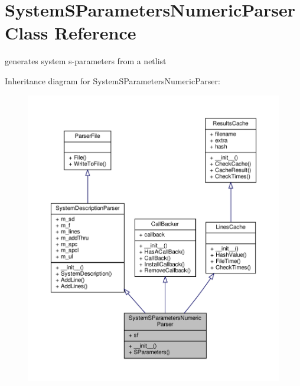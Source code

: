 \hypertarget{classSignalIntegrity_1_1Parsers_1_1SystemSParametersParser_1_1SystemSParametersNumericParser}{}\section{System\+S\+Parameters\+Numeric\+Parser Class Reference}
\label{classSignalIntegrity_1_1Parsers_1_1SystemSParametersParser_1_1SystemSParametersNumericParser}


generates system s-\/parameters from a netlist  




Inheritance diagram for System\+S\+Parameters\+Numeric\+Parser\+:
\nopagebreak
\begin{figure}[H]
\begin{center}
\leavevmode
\includegraphics[width=350pt]{classSignalIntegrity_1_1Parsers_1_1SystemSParametersParser_1_1SystemSParametersNumericParser__inherit__graph}
\end{center}
\end{figure}


